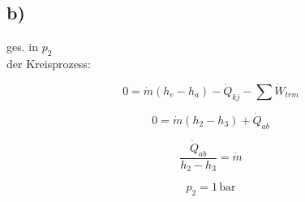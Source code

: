 

\subsection*{b)}
ges. in $p_2$\\
der Kreisprozess:

\[
0 = \dot{m} (h_e - h_a) - \dot{Q}_{kj} - \sum \dot{W}_{trm}
\]

\[
0 = \dot{m} (h_2 - h_3) + \dot{Q}_{ab}
\]

\[
\frac{\dot{Q}_{ab}}{h_2 - h_3} = \dot{m}
\]

\[
p_2 = 1 \, \text{bar}
\]